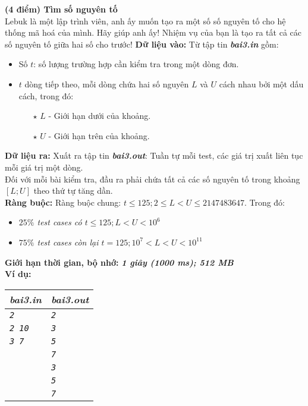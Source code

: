 \begin{ex}
	\textbf{(4 điểm) Tìm số nguyên tố}\\
	Lebuk là một lập trình viên, anh ấy muốn tạo ra một số số  nguyên tố cho hệ thống mã hoá của mình. Hãy giúp anh ấy! Nhiệm vụ của bạn là tạo ra tất cả các số nguyên tố giữa hai số cho trước!
	\textbf{Dữ liệu vào: } Từ tập tin \textbf{\textit{bai3.in}} gồm: 
	\begin{itemize}
		\item Số $t$: số lượng trường hợp cần kiểm tra trong một dòng đơn. 
		\item $t$ dòng tiếp theo, mỗi dòng chứa hai số nguyên $L$ và $U$ cách nhau bởi một dấu cách, trong đó: 
		\begin{itemize}
			\item[$\star$] $L$ - Giới hạn dưới của khoảng. 
			\item[$\star$] $U$ - Giới hạn trên của khoảng. 
		\end{itemize}
	\end{itemize}
	\textbf{Dữ liệu ra: } Xuất ra tập tin \textbf{\textit{bai3.out}}: Tuần tự mỗi test, các giá trị xuất liên tục mỗi giá trị một dòng. \\
	Đối với mỗi bài kiểm tra, đầu ra phải chứa tất cả các số nguyên tố trong khoảng $[L; U]$ theo thứ tự tăng dần. \\
	\textbf{Ràng buộc: } Ràng buộc chung: $t \leq 125; 2 \leq L < U \leq 2147483647$. Trong đó: 
	\begin{itemize}
		\item \textit{$25\%$ test cases có $t \leq 125; L < U < 10^6$}
		\item \textit{$75\%$ test cases còn lại $t = 125; 10^{7} < L < U < 10^{11}$}
	\end{itemize}
	\textbf{Giới hạn thời gian, bộ nhớ: } \textbf{\textit{1 giây (1000 ms); 512 MB}} \\
	\textbf{Ví dụ: } 
	\begin{center}
		\begin{tabular}{|l|l|}
			\hline
			\textbf{\textsf{\textit{bai3.in}}} & \textbf{\textsf{\textit{bai3.out}}} \\ %
			\hline
			\textit{\texttt{2}} & \textit{\texttt{2}} \\ %
			\textit{\texttt{2 10}} & \textit{\texttt{3}} \\ %
			\textit{\texttt{3 7}} & \textit{\texttt{5}} \\ %
			 & \textit{\texttt{7}} \\ %
			 & \textit{\texttt{3}} \\
			 & \textit{\texttt{5}}\\
			 & \textit{\texttt{7}}\\
			\hline
		\end{tabular}
	\end{center}
\end{ex}


